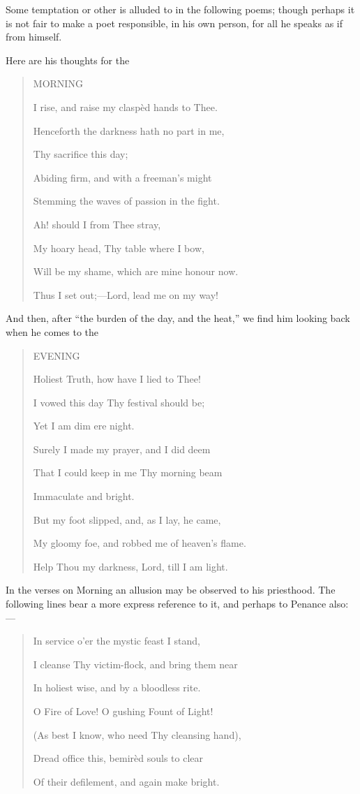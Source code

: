 Some temptation or other is alluded to in the following poems;
though perhaps it is not fair to make a poet responsible, in his own
person, for all he speaks as if from himself.

Here are his thoughts for the

\begin{quote}

MORNING

I rise, and raise my claspèd hands to Thee.

Henceforth the darkness hath no part in me,

Thy sacrifice this day;

Abiding firm, and with a freeman's might

Stemming the waves of passion in the fight.

Ah! should I from Thee stray,

My hoary head, Thy table where I bow,

Will be my shame, which are mine honour now.

Thus I set out;—Lord, lead me on my way!

\end{quote}

And then, after ``the burden of the day, and the heat,'' we
find him looking back when he comes to the

\begin{quote}

EVENING

Holiest Truth, how have I lied to Thee!

I vowed this day Thy festival should be;

Yet I am dim ere night.

Surely I made my prayer, and I did deem

That I could keep in me Thy morning beam

Immaculate and bright. 

But my foot slipped, and, as I lay, he came,

My gloomy foe, and robbed me of heaven's flame.

Help Thou my darkness, Lord, till I am light.

\end{quote}

In the verses on Morning an allusion may be observed to his
priesthood. The following lines bear a more express reference to it,
and perhaps to Penance also:—

\begin{quote}

In service o'er the mystic feast I stand,

I cleanse Thy victim-flock, and bring them near

In holiest wise, and by a bloodless rite.

O Fire of Love! O gushing Fount of Light!

(As best I know, who need Thy cleansing hand),

Dread office this, bemirèd souls to clear

Of their defilement, and again make bright.

\end{quote}


